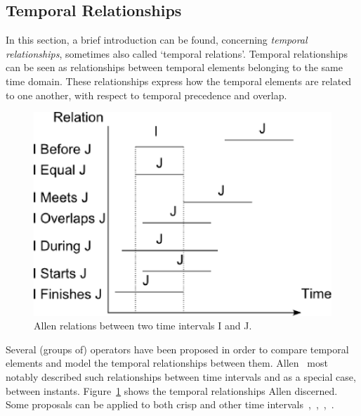\subsection{\label{allen-crisp}Temporal Relationships}
In this section, a brief introduction can be found, concerning \emph{temporal relationships}, sometimes also called `temporal relations'\cite{Billiet:Pons:Matthe:DeTre:Pons:2011:BipolarFuzzy}. Temporal relationships can be seen as relationships between temporal elements belonging to the same time domain. These relationships express how the temporal elements are related to one another, with respect to temporal precedence and overlap.

\def\JPicScale{0.5}
\begin{figure}[h]
\centering
\includegraphics[scale=0.5]{graphs/allen.eps}
\caption{Allen relations between two time intervals I and J.}
\label{fig:allen}
\end{figure}

Several (groups of) operators have been proposed in order to compare temporal elements and model the temporal relationships between them. Allen~\cite{Allen83} most notably described such relationships between time intervals and as a special case, between instants. Figure~\ref{fig:allen} shows the temporal relationships Allen discerned. Some proposals can be applied to both crisp and other time intervals~\cite{ohlbach2004},~\cite{nagypal2003},~\cite{schockaert08},~\cite{garrido2009}.

